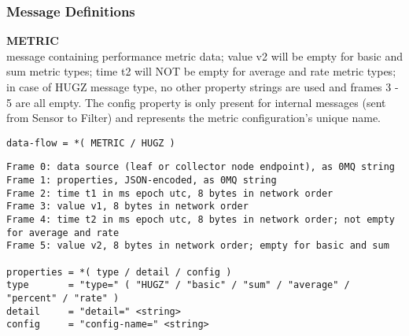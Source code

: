 \subsubsection{Message Definitions}

\textbf{METRIC} \\
message containing performance metric data; value v2 will be empty for basic and sum metric types; time t2 will NOT be
empty for average and rate metric types; in case of HUGZ message type, no other property strings are used and frames 3 -
5 are all empty. The config property is only present for internal messages (sent from Sensor to Filter) and represents
the metric configuration's unique name.

\begin{lstlisting}
data-flow = *( METRIC / HUGZ )
\end{lstlisting}

\begin{lstlisting}
Frame 0: data source (leaf or collector node endpoint), as 0MQ string
Frame 1: properties, JSON-encoded, as 0MQ string
Frame 2: time t1 in ms epoch utc, 8 bytes in network order
Frame 3: value v1, 8 bytes in network order
Frame 4: time t2 in ms epoch utc, 8 bytes in network order; not empty for average and rate
Frame 5: value v2, 8 bytes in network order; empty for basic and sum

properties = *( type / detail / config )
type       = "type=" ( "HUGZ" / "basic" / "sum" / "average" / "percent" / "rate" )
detail     = "detail=" <string>
config     = "config-name=" <string>
\end{lstlisting}
